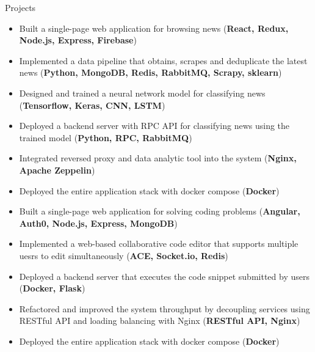 \documentclass{resume}
\begin{document}
\begin{section}{Projects}
\vspace{0cm}
\begin{itemize}[topsep=0pt, itemsep=0pt, partopsep=0pt, parsep=0pt]
    \item Built a single-page web application for browsing news (\textbf{React, Redux, Node.js, Express, Firebase})
    \item Implemented a data pipeline that obtains, scrapes and deduplicate the latest news (\textbf{Python, MongoDB, Redis, RabbitMQ, Scrapy, sklearn})
    \item Designed and trained a neural network model for classifying news (\textbf{Tensorflow, Keras, CNN, LSTM})
    \item Deployed a backend server with RPC API for classifying news using the trained model (\textbf{Python, RPC, RabbitMQ})
    \item Integrated reversed proxy and data analytic tool into the system (\textbf{Nginx, Apache Zeppelin})
    \item Deployed the entire application stack with docker compose (\textbf{Docker})
\end{itemize}
\vspace{0.15cm}
\vspace{0cm}
\begin{itemize}[topsep=0pt, itemsep=0pt, partopsep=0pt, parsep=0pt]
    \item Built a single-page web application for solving coding problems (\textbf{Angular, Auth0, Node.js, Express, MongoDB})
    \item Implemented a web-based collaborative code editor that supports multiple uesrs to edit simultaneously (\textbf{ACE, Socket.io, Redis})
    \item Deployed a backend server that executes the code snippet submitted by users (\textbf{Docker, Flask})
    \item Refactored and improved the system throughput by decoupling services using RESTful API and loading balancing with Nginx (\textbf{RESTful API, Nginx})
    \item Deployed the entire application stack with docker compose (\textbf{Docker})
\end{itemize}
\end{section}
\end{document}
